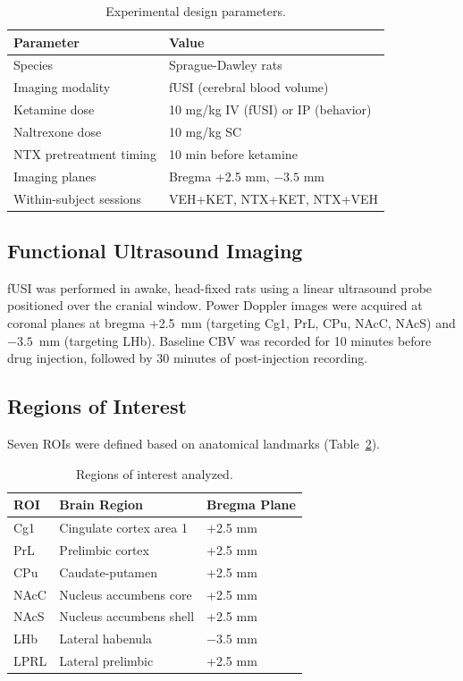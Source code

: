 \documentclass[11pt]{article}
\begin{document}
\begin{table}[h]
\centering
\caption{Experimental design parameters.}
\label{tab:design}
\begin{tabular}{ll}
\toprule
Parameter & Value \\
\midrule
Species & Sprague-Dawley rats \\
Imaging modality & fUSI (cerebral blood volume) \\
Ketamine dose & 10 mg/kg IV (fUSI) or IP (behavior) \\
Naltrexone dose & 10 mg/kg SC \\
NTX pretreatment timing & 10 min before ketamine \\
Imaging planes & Bregma +2.5 mm, $-3.5$ mm \\
Within-subject sessions & VEH+KET, NTX+KET, NTX+VEH \\
\bottomrule
\end{tabular}
\end{table}

\subsection{Functional Ultrasound Imaging}

fUSI was performed in awake, head-fixed rats using a linear ultrasound probe positioned over the cranial window. Power Doppler images were acquired at coronal planes at bregma +2.5~mm (targeting Cg1, PrL, CPu, NAcC, NAcS) and $-3.5$~mm (targeting LHb). Baseline CBV was recorded for 10 minutes before drug injection, followed by 30 minutes of post-injection recording.

\subsection{Regions of Interest}

Seven ROIs were defined based on anatomical landmarks (Table~\ref{tab:rois}).

\begin{table}[h]
\centering
\caption{Regions of interest analyzed.}
\label{tab:rois}
\begin{tabular}{lll}
\toprule
ROI & Brain Region & Bregma Plane \\
\midrule
Cg1 & Cingulate cortex area 1 & +2.5 mm \\
PrL & Prelimbic cortex & +2.5 mm \\
CPu & Caudate-putamen & +2.5 mm \\
NAcC & Nucleus accumbens core & +2.5 mm \\
NAcS & Nucleus accumbens shell & +2.5 mm \\
LHb & Lateral habenula & $-3.5$ mm \\
LPRL & Lateral prelimbic & +2.5 mm \\
\bottomrule
\end{tabular}
\end{table}
\end{document}
